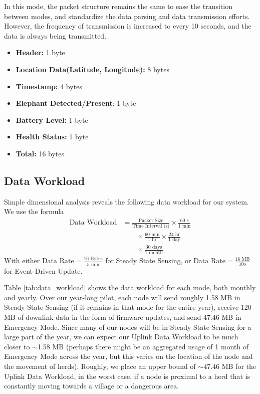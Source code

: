 In this mode, the packet structure remains the same to ease the transition between modes, and standardize the data parsing and data transmission efforts. However, the frequency of transmission is increased to every 10 seconds, and the data is always being transmitted. 
\begin{itemize}
    \item \textbf{Header:} 1 byte
    \item \textbf{Location Data(Latitude, Longitude):} 8 bytes
    \item \textbf{Timestamp:} 4 bytes
    \item \textbf{Elephant Detected/Present}: 1 byte
    \item \textbf{Battery Level:} 1 byte
    \item \textbf{Health Status:} 1 byte
    \item \textbf{Total:} 16 bytes
\end{itemize}

\subsection{Data Workload}

Simple dimensional analysis reveals the following data workload for our system. We use the formula
\begin{align*}
    \text{Data Workload} &= \frac{\text{Packet Size}}{\text{Time Interval (s)}} \times \frac{60 \text{ s}}{1 \text{ min}} \\
        &\qquad \times \frac{60 \text{ min}}{1 \text{ hr}} \times \frac{24 \text{ hr}}{1 \text{ day}} \\
        &\qquad \times \frac{30 \text{ days}}{1 \text{ month}}
    \end{align*}
With either $\text{Data Rate} = \frac{16 \text{ Bytes}}{5 \text{ min}}$ for Steady State Sensing, or $\text{Data Rate} = \frac{16 \text{ MB}}{10 s}$ for Event-Driven Update.


Table \ref{tab:data_workload} shows the data workload for each mode, both monthly and yearly. Over our year-long pilot, each node will send roughly 1.58 MB in Steady State Sensing (if it remains in that mode for the entire year), receive 120 MB of downlink data in the form of firmware updates, and send 47.46 MB in Emergency Mode. Since many of our nodes will be in Steady State Sensing for a large part of the year, we can expect our Uplink Data Workload to be much closer to $\sim$1.58 MB (perhaps there might be an aggregated usage of 1 month of Emergency Mode across the year, but this varies on the location of the node and the movement of herds). Roughly, we place an upper bound of $\sim47.46$ MB for the Uplink Data Workload, in the worst case, if a node is proximal to a herd that is constantly moving towards a village or a dangerous area.

